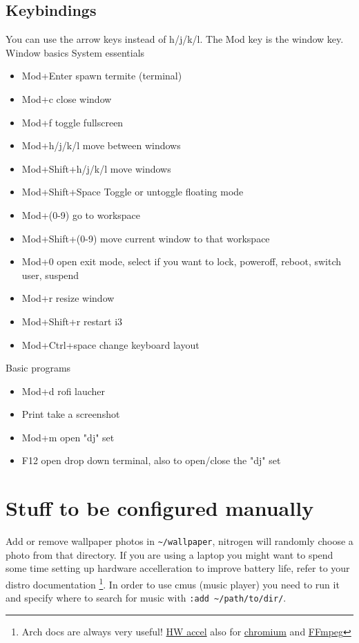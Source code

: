\documentclass{article}
\begin{document}
\subsection*{Keybindings}
You can use the arrow keys instead of h/j/k/l. The Mod key is the window key.
\newline Window basics \hfill System essentials
\renewcommand{\labelitemi}{\textbullet}
\renewcommand\labelitemii{\textbullet}
\begin{multicols}{2}
\begin{itemize}
    \item Mod+Enter spawn termite (terminal)
    \item Mod+c close window
    \item Mod+f toggle fullscreen
    \item Mod+h/j/k/l move between windows
    \item Mod+Shift+h/j/k/l move windows
    \item Mod+Shift+Space Toggle or untoggle floating mode
    \item Mod+(0-9) go to workspace
    \item Mod+Shift+(0-9) move current window to that workspace
    \item Mod+0 open exit mode, select if you want to lock, poweroff, reboot, switch user, suspend 
    \item Mod+r resize window
    \item Mod+Shift+r restart i3
    \item Mod+Ctrl+space change keyboard layout
\end{itemize}
\hfill Basic programs
\begin{itemize}
    \item Mod+d rofi laucher
    \item Print take a screenshot
    \item Mod+m open "dj" set
    \item F12 open drop down terminal, also to open/close the "dj" set
\end{itemize}
\end{multicols}

\section*{Stuff to be configured manually}
Add or remove wallpaper photos in \verb|~/wallpaper|, nitrogen will randomly choose a photo from that directory. If you are using a laptop you might want to spend some time setting up hardware accelleration to improve battery life, refer to your distro documentation \footnote{Arch docs are always very useful! \href{https://wiki.archlinux.org/index.php/Hardware_video_acceleration}{HW accel} also for \href{https://wiki.archlinux.org/index.php/chromium#Hardware_video_acceleration}{chromium} and \href{https://trac.ffmpeg.org/wiki/HWAccelIntro}{FFmpeg}}. In order to use cmus (music player) you need to run it and specify where to search for music with \verb|:add ~/path/to/dir/|.
\end{document}
